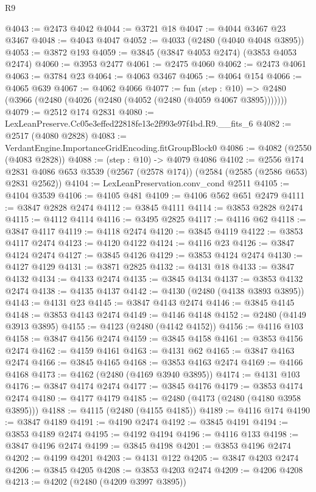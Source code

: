 \begin{lexlean}{R9}
\begin{coremodule}
@4043 := @2473 @4042
@4044 := @3721 @18
@4047 := @4044 @3467 @23 @3467
@4048 := @4043 @4047
@4052 := @4033 (@2480 (@4040 @4048 @3895))
@4053 := @3872 @193
@4059 := @3845 (@3847 @4053 @2474) (@3853 @4053 @2474)
@4060 := @3953 @2477
@4061 := @2475 @4060
@4062 := @2473 @4061
@4063 := @3784 @23
@4064 := @4063 @3467
@4065 := @4064 @154
@4066 := @4065 @639
@4067 := @4062 @4066
@4077 := fun (step : @10) =>
  @2480 (@3966 (@2480 (@4026 (@2480 (@4052 (@2480 (@4059 @4067 @3895)))))))
@4079 := @2512 @174 @2831
@4080 := LexLeanPreserve.Cc05e3effed22818fe13e2f993e97f4bd.R9.__fits_6
@4082 := @2517 (@4080 @2828)
@4083 := VerdantEngine.ImportanceGridEncoding.fitGroupBlock0
@4086 := @4082 (@2550 (@4083 @2828))
@4088 := (step : @10) -> @4079 @4086
@4102 := @2556
    @174
    @2831
    @4086
    @653
    @3539
    (@2567 (@2578 @174))
    (@2584 (@2585 (@2586 @653) @2831 @2562))
@4104 := LexLeanPreservation.conv_cond @2511
@4105 := @4104 @3539
@4106 := @4105 @481
@4109 := @4106 @562 @651 @2479
@4111 := @3847 @2828 @2474
@4112 := @3845 @4111
@4114 := @3853 @2828 @2474
@4115 := @4112 @4114
@4116 := @3495 @2825
@4117 := @4116 @62
@4118 := @3847 @4117
@4119 := @4118 @2474
@4120 := @3845 @4119
@4122 := @3853 @4117 @2474
@4123 := @4120 @4122
@4124 := @4116 @23
@4126 := @3847 @4124 @2474
@4127 := @3845 @4126
@4129 := @3853 @4124 @2474
@4130 := @4127 @4129
@4131 := @3871 @2825
@4132 := @4131 @18
@4133 := @3847 @4132
@4134 := @4133 @2474
@4135 := @3845 @4134
@4137 := @3853 @4132 @2474
@4138 := @4135 @4137
@4142 := @4130 (@2480 (@4138 @3893 @3895))
@4143 := @4131 @23
@4145 := @3847 @4143 @2474
@4146 := @3845 @4145
@4148 := @3853 @4143 @2474
@4149 := @4146 @4148
@4152 := @2480 (@4149 @3913 @3895)
@4155 := @4123 (@2480 (@4142 @4152))
@4156 := @4116 @103
@4158 := @3847 @4156 @2474
@4159 := @3845 @4158
@4161 := @3853 @4156 @2474
@4162 := @4159 @4161
@4163 := @4131 @62
@4165 := @3847 @4163 @2474
@4166 := @3845 @4165
@4168 := @3853 @4163 @2474
@4169 := @4166 @4168
@4173 := @4162 (@2480 (@4169 @3940 @3895))
@4174 := @4131 @103
@4176 := @3847 @4174 @2474
@4177 := @3845 @4176
@4179 := @3853 @4174 @2474
@4180 := @4177 @4179
@4185 := @2480 (@4173 (@2480 (@4180 @3958 @3895)))
@4188 := @4115 (@2480 (@4155 @4185))
@4189 := @4116 @174
@4190 := @3847 @4189
@4191 := @4190 @2474
@4192 := @3845 @4191
@4194 := @3853 @4189 @2474
@4195 := @4192 @4194
@4196 := @4116 @133
@4198 := @3847 @4196 @2474
@4199 := @3845 @4198
@4201 := @3853 @4196 @2474
@4202 := @4199 @4201
@4203 := @4131 @122
@4205 := @3847 @4203 @2474
@4206 := @3845 @4205
@4208 := @3853 @4203 @2474
@4209 := @4206 @4208
@4213 := @4202 (@2480 (@4209 @3997 @3895))

\end{coremodule}
\end{lexlean}
